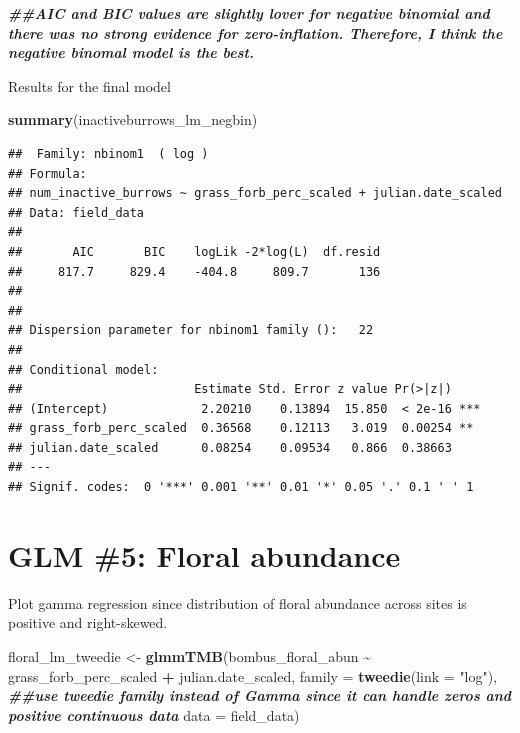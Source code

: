 \documentclass[
]{article}
\newenvironment{Shaded}{\begin{snugshade}}{\end{snugshade}}
\newcommand{\AttributeTok}[1]{\textcolor[rgb]{0.13,0.29,0.53}{#1}}
\newcommand{\DocumentationTok}[1]{\textcolor[rgb]{0.56,0.35,0.01}{\textbf{\textit{#1}}}}
\newcommand{\FunctionTok}[1]{\textcolor[rgb]{0.13,0.29,0.53}{\textbf{#1}}}
\newcommand{\NormalTok}[1]{#1}
\newcommand{\OtherTok}[1]{\textcolor[rgb]{0.56,0.35,0.01}{#1}}
\newcommand{\SpecialCharTok}[1]{\textcolor[rgb]{0.81,0.36,0.00}{\textbf{#1}}}
\newcommand{\StringTok}[1]{\textcolor[rgb]{0.31,0.60,0.02}{#1}}
\begin{document}
\begin{Shaded}
\begin{Highlighting}[]
\DocumentationTok{\#\#AIC and BIC values are slightly lover for negative binomial and there was no strong evidence for zero{-}inflation. Therefore, I think the negative binomal model is the best. }
\end{Highlighting}
\end{Shaded}

Results for the final model

\begin{Shaded}
\begin{Highlighting}[]
\FunctionTok{summary}\NormalTok{(inactiveburrows\_lm\_negbin)}
\end{Highlighting}
\end{Shaded}

\begin{verbatim}
##  Family: nbinom1  ( log )
## Formula:          
## num_inactive_burrows ~ grass_forb_perc_scaled + julian.date_scaled
## Data: field_data
## 
##       AIC       BIC    logLik -2*log(L)  df.resid 
##     817.7     829.4    -404.8     809.7       136 
## 
## 
## Dispersion parameter for nbinom1 family ():   22 
## 
## Conditional model:
##                        Estimate Std. Error z value Pr(>|z|)    
## (Intercept)             2.20210    0.13894  15.850  < 2e-16 ***
## grass_forb_perc_scaled  0.36568    0.12113   3.019  0.00254 ** 
## julian.date_scaled      0.08254    0.09534   0.866  0.38663    
## ---
## Signif. codes:  0 '***' 0.001 '**' 0.01 '*' 0.05 '.' 0.1 ' ' 1
\end{verbatim}

\section{GLM \#5: Floral abundance}\label{glm-5-floral-abundance}

Plot gamma regression since distribution of floral abundance across
sites is positive and right-skewed.

\begin{Shaded}
\begin{Highlighting}[]
\NormalTok{floral\_lm\_tweedie }\OtherTok{\textless{}{-}} \FunctionTok{glmmTMB}\NormalTok{(bombus\_floral\_abun }\SpecialCharTok{\textasciitilde{}}\NormalTok{ grass\_forb\_perc\_scaled }\SpecialCharTok{+} 
\NormalTok{                    julian.date\_scaled, }
                  \AttributeTok{family =} \FunctionTok{tweedie}\NormalTok{(}\AttributeTok{link =} \StringTok{"log"}\NormalTok{), }\DocumentationTok{\#\#use tweedie family instead of Gamma since it can handle zeros and positive continuous data}
                  \AttributeTok{data =}\NormalTok{ field\_data)}
\end{Highlighting}
\end{Shaded}
\end{document}
